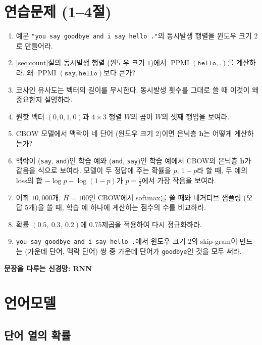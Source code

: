 \documentclass[11pt,a4paper]{article}
\newcommand{\partbanner}[1]{%
  \par\vspace{0.8em}%
  \begin{tcolorbox}[colback=deepblue,colframe=deepblue,arc=1.5mm,boxrule=0pt,left=4mm,top=2mm,bottom=2mm]
  {\color{white}\large\bfseries #1}
  \end{tcolorbox}\par}
\newcommand{\vect}[1]{\bm{#1}}
\newcommand{\w}[1]{\texttt{#1}}
\begin{document}
\section*{연습문제 (1--4절)}

\begin{enumerate}[label=\arabic*.]
\item 예문 \w{"you say goodbye and i say hello ."}의 동시발생 행렬을 윈도우 크기 $2$로 만들어라.
\item \ref{sec:count}절의 동시발생 행렬 (윈도우 크기 $1$)에서 $\operatorname{PPMI}(\w{hello},\w{.})$를 계산하라. 왜 $\operatorname{PPMI}(\w{say},\w{hello})$보다 큰가?
\item 코사인 유사도는 벡터의 길이를 무시한다. 동시발생 횟수를 그대로 쓸 때 이것이 왜 중요한지 설명하라.
\item 원핫 벡터 $(0,0,1,0)$과 $4\times3$ 행렬 $W$의 곱이 $W$의 셋째 행임을 보여라.
\item CBOW 모델에서 맥락이 네 단어 (윈도우 크기 $2$)이면 은닉층 $\vect h$는 어떻게 계산하는가?
\item 맥락이 (\w{say}, \w{and})인 학습 예와 (\w{and}, \w{say})인 학습 예에서 CBOW의 은닉층 $\vect h$가 같음을 식으로 보여라.
모델이 두 정답에 주는 확률을 $p$, $1-p$라 할 때, 두 예의 loss의 합 $-\log p-\log(1-p)$가 $p=\tfrac12$에서 가장 작음을 보여라.
\item 어휘 $10{,}000$개, $H=100$인 CBOW에서 softmax를 쓸 때와 네거티브 샘플링 (오답 $5$개)을 쓸 때, 학습 예 하나에 계산하는 점수의 수를 비교하라.
\item 확률 $(0.5,\ 0.3,\ 0.2)$에 $0.75$제곱을 적용하여 다시 정규화하라.
\item \w{you say goodbye and i say hello .}에서 윈도우 크기 $2$의 skip-gram이 만드는 (가운데 단어, 맥락 단어) 쌍 중 가운데 단어가 \w{goodbye}인 것을 모두 써라.
\end{enumerate}

\clearpage
\partbanner{문장을 다루는 신경망: RNN}

\section{언어모델}\label{sec:lm}

\subsection{단어 열의 확률}
\end{document}
